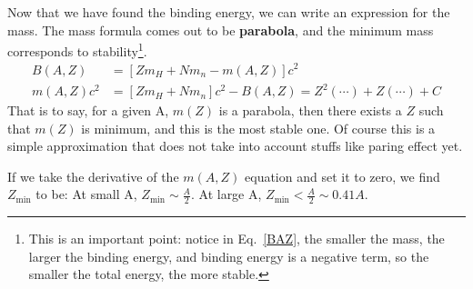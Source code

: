 \documentclass{school-22.101-notes}
\date{November 14, 2011}
\begin{document}
\maketitle




Now that we have found the binding energy, we can write an expression for the mass. The mass formula comes out to be \textbf{parabola}, and the minimum mass corresponds to stability\footnote{This is an important point: notice in Eq.~\ref{BAZ}, the smaller the mass, the larger the binding energy, and binding energy is a negative term, so the smaller the total energy, the more stable. }.
\begin{align}
B(A,Z) &= \left[ Z m_H + N m_n - m(A,Z) \right] c^2  \label{BAZ}\\
m(A,Z) c^2 &= \left[ Z m_H + N m_n \right] c^2 - B(A,Z) = Z^2 (\cdots) + Z(\cdots) + C 
\end{align}
That is to say, for a given A, $m(Z)$ is a parabola, then there exists a $Z$ such that $m(Z)$ is minimum, and this is the most stable one. Of course this is a simple approximation that does not take into account stuffs like paring effect yet. 

If we take the derivative of the $m(A,Z)$ equation and set it to zero, we find $Z_{\mathrm{min}}$ to be: 
At small A, $Z_{\mathrm{min}} \sim \frac{A}{2}$. At large A, $Z_{\mathrm{min}} < \frac{A}{2} \sim 0.41 A$. 
\end{document}
